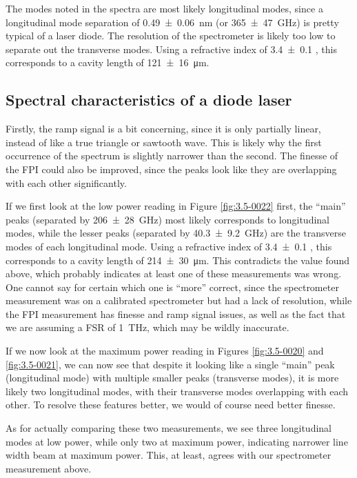 \documentclass[a4paper]{scrartcl}
\begin{document}
The modes noted in the spectra are most likely longitudinal modes, since a longitudinal mode separation of \SI{0.49 \pm 0.06}{\nano\metre} (or \SI{365 \pm 47}{\giga\hertz}) is pretty typical of a laser diode. The resolution of the spectrometer is likely too low to separate out the transverse modes. Using a refractive index of \SI{3.4 \pm 0.1}{} \cite{Moser1994}, this corresponds to a cavity length of \SI{121 \pm 16}{\micro\metre}.

\subsection{Spectral characteristics of a diode laser}
Firstly, the ramp signal is a bit concerning, since it is only partially linear, instead of like a true triangle or sawtooth wave. This is likely why the first occurrence of the spectrum is slightly narrower than the second. The finesse of the FPI could also be improved, since the peaks look like they are overlapping with each other significantly.

If we first look at the low power reading in Figure \ref{fig:3.5-0022} first, the ``main'' peaks (separated by \SI{206 \pm 28}{\giga\hertz}) most likely corresponds to longitudinal modes, while the lesser peaks (separated by \SI{40.3 \pm 9.2}{\giga\hertz}) are the transverse modes of each longitudinal mode. Using a refractive index of \SI{3.4 \pm 0.1}{} \cite{Moser1994}, this corresponds to a cavity length of \SI{214 \pm 30}{\micro\metre}. This contradicts the value found above, which probably indicates at least one of these measurements was wrong. One cannot say for certain which one is ``more'' correct, since the spectrometer measurement was on a calibrated spectrometer but had a lack of resolution, while the FPI measurement has finesse and ramp signal issues, as well as the fact that we are assuming a FSR of \SI{1}{\tera\hertz}, which may be wildly inaccurate.

If we now look at the maximum power reading in Figures \ref{fig:3.5-0020} and \ref{fig:3.5-0021}, we can now see that despite it looking like a single ``main'' peak (longitudinal mode) with multiple smaller peaks (transverse modes), it is more likely two longitudinal modes, with their transverse modes overlapping with each other. To resolve these features better, we would of course need better finesse.

As for actually comparing these two measurements, we see three longitudinal modes at low power, while only two at maximum power, indicating narrower line width beam at maximum power. This, at least, agrees with our spectrometer measurement above.

\printbibliography
\end{document}
